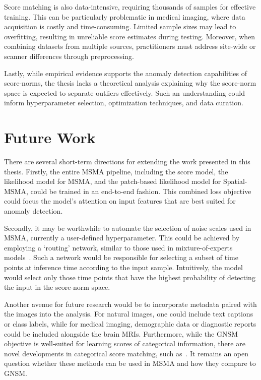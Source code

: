 Score matching is also data-intensive, requiring thousands of samples for effective training. This can be particularly problematic in medical imaging, where data acquisition is costly and time-consuming. Limited sample sizes may lead to overfitting, resulting in unreliable score estimates during testing. Moreover, when combining datasets from multiple sources, practitioners must address site-wide or scanner differences through preprocessing.

Lastly, while empirical evidence supports the anomaly detection capabilities of score-norms, the thesis lacks a theoretical analysis explaining why the score-norm space is expected to separate outliers effectively. Such an understanding could inform hyperparameter selection, optimization techniques, and data curation.

\section{Future Work}

There are several short-term directions for extending the work presented in this thesis. Firstly, the entire MSMA pipeline, including the score model, the likelihood model for MSMA, and the patch-based likelihood model for Spatial-MSMA, could be trained in an end-to-end fashion. This combined loss objective could focus the model's attention on input features that are best suited for anomaly detection.

Secondly, it may be worthwhile to automate the selection of noise scales used in MSMA, currently a user-defined hyperparameter. This could be achieved by employing a `routing' network, similar to those used in mixture-of-experts models~\cite{zoph2022stmoe}. Such a network would be responsible for selecting a subset of time points at inference time according to the input sample. Intuitively, the model would select only those time points that have the highest probability of detecting the input in the score-norm space.

Another avenue for future research would be to incorporate metadata paired with the images into the analysis. For natural images, one could include text captions or class labels, while for medical imaging, demographic data or diagnostic reports could be included alongside the brain MRIs. Furthermore, while the GNSM objective is well-suited for learning scores of categorical information, there are novel developments in categorical score matching, such as~\cite{graves2024bayesian,lou2024discrete}. It remains an open question whether these methods can be used in MSMA and how they compare to GNSM.

